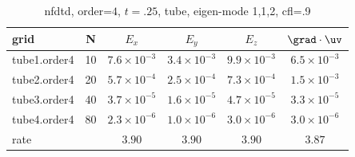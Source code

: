 
\begin{table}[hbt]
\begin{center}
\begin{tabular}{|l|c|c|c|c|c|} \hline\hline 
grid  & N &  $E_x$ &  $E_y$ & $E_z$ & $\grad\cdot\uv$\\ \hline 
        tube1.order4 &    10 &  $7.6\times10^{ -3}$  &  $3.4\times10^{ -3}$  &  $9.9\times10^{ -3}$  &  $6.5\times10^{ -3}$   \\ \hline
        tube2.order4 &    20 &  $5.7\times10^{ -4}$  &  $2.5\times10^{ -4}$  &  $7.3\times10^{ -4}$  &  $1.5\times10^{ -3}$   \\ \hline
        tube3.order4 &    40 &  $3.7\times10^{ -5}$  &  $1.6\times10^{ -5}$  &  $4.7\times10^{ -5}$  &  $3.3\times10^{ -5}$   \\ \hline
        tube4.order4 &    80 &  $2.3\times10^{ -6}$  &  $1.0\times10^{ -6}$  &  $3.0\times10^{ -6}$  &  $3.0\times10^{ -6}$   \\ \hline
    rate            &     &       $3.90$ &       $3.90$ &       $3.90$ &       $3.87$  \\ \hline\hline
\end{tabular}
\caption{nfdtd, order=$4$, $t=.25$, tube, eigen-mode 1,1,2, cfl=.9}\label{table:mx.tube}
\end{center}
\end{table}

